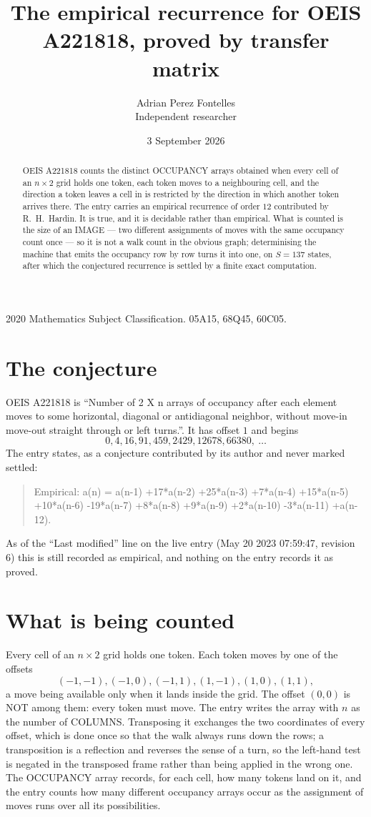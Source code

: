 \documentclass[11pt,a4paper]{article}
\title{The empirical recurrence for OEIS A221818, proved by transfer matrix}
\author{Adrian Perez Fontelles\\ \small Independent researcher}
\date{3 September 2026}
\theoremstyle{plain}
\theoremstyle{definition}
\begin{document}
\maketitle

\begin{abstract}
OEIS A221818 counts the distinct OCCUPANCY arrays obtained when every cell of an $n\times2$ grid
holds one token, each token moves to a neighbouring cell, and the direction a token leaves a
cell in is restricted by the direction in which another token arrives there. The entry carries
an empirical recurrence of order $12$ contributed by R.~H.~Hardin. It is true, and it is
decidable rather than empirical. What is counted is the size of an IMAGE --- two different
assignments of moves with the same occupancy count once --- so it is not a walk count in the
obvious graph; determinising the machine that emits the occupancy row by row turns it into
one, on $S=137$ states, after which the conjectured recurrence is settled by a finite exact
computation.
\end{abstract}

\noindent\small 2020 Mathematics Subject Classification. 05A15, 68Q45, 60C05.\normalsize

\section{The conjecture}

OEIS A221818 is ``Number of 2 X n arrays of occupancy after each element moves to some horizontal, diagonal or antidiagonal neighbor, without move-in move-out straight through or left turns.''. It has offset $1$ and begins
\[
0, 4, 16, 91, 459, 2429, 12678, 66380,\ \dots
\]
The entry states, as a conjecture contributed by its author and never marked settled:
\begin{quote}
Empirical: a(n) = a(n-1) +17*a(n-2) +25*a(n-3) +7*a(n-4) +15*a(n-5) +10*a(n-6) -19*a(n-7) +8*a(n-8) +9*a(n-9) +2*a(n-10) -3*a(n-11) +a(n-12).
\end{quote}
As of the ``Last modified'' line on the live entry (May 20 2023 07:59:47, revision 6) this is still
recorded as empirical, and nothing on the entry records it as proved.

\section{What is being counted}

Every cell of an $n\times2$ grid holds one token. Each token moves by one of the offsets
\[
(-1,-1), (-1,0), (-1,1), (1,-1), (1,0), (1,1),
\]
a move being available only when it lands inside the grid. The offset $(0,0)$ is NOT among them: every token must move. The entry writes the array with $n$ as the number of COLUMNS. Transposing it exchanges the two coordinates of every offset, which is done once so that the walk always runs down the rows; a transposition is a reflection and reverses the sense of a turn, so the left-hand test is negated in the transposed frame rather than being applied in the wrong one. The OCCUPANCY array
records, for each cell, how many tokens land on it, and the entry counts how many different
occupancy arrays occur as the assignment of moves runs over all its possibilities.
\end{document}
